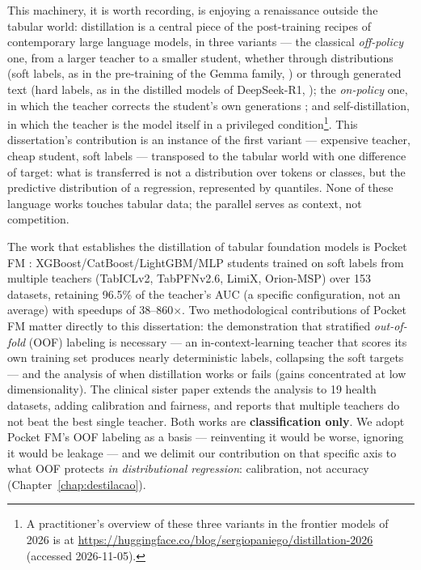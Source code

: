 This machinery, it is worth recording, is enjoying a renaissance
outside the tabular world: distillation is a central piece of the
post-training recipes of contemporary large language models, in
three variants --- the classical \emph{off-policy} one, from a
larger teacher to a smaller student, whether through distributions
(soft labels, as in the pre-training of the Gemma family,
\citealp{gemma2025}) or through generated text (hard labels, as in
the distilled models of DeepSeek-R1, \citealp{deepseek2025}); the
\emph{on-policy} one, in which the teacher corrects the student's
own generations \citep{agarwal2024}; and self-distillation, in
which the teacher is the model itself in a privileged
condition\footnote{A practitioner's overview of these three
variants in the frontier models of 2026 is at
\url{https://huggingface.co/blog/sergiopaniego/distillation-2026}
(accessed 2026-11-05).}. This dissertation's contribution is an
instance of the first variant --- expensive teacher, cheap student,
soft labels --- transposed to the tabular world with one difference
of target: what is transferred is not a distribution over tokens or
classes, but the predictive distribution of a regression,
represented by quantiles. None of these language works touches
tabular data; the parallel serves as context, not competition.

The work that establishes the distillation of tabular foundation
models is Pocket FM \citep{pocketfm2026}:
XGBoost/CatBoost/LightGBM/MLP students trained on soft labels from
multiple teachers (TabICLv2, TabPFNv2.6, LimiX, Orion-MSP) over 153
datasets, retaining 96.5\% of the teacher's AUC (a specific
configuration, not an average) with speedups of
38--860$\times$. Two methodological contributions of Pocket FM
matter directly to this dissertation: the demonstration that
stratified \emph{out-of-fold} (OOF) labeling is necessary --- an
in-context-learning teacher that scores its own training set
produces nearly deterministic labels, collapsing the soft targets
--- and the analysis of when distillation works or fails (gains
concentrated at low dimensionality). The clinical sister paper
\citep{pocketfmhealth2026} extends the analysis to 19 health
datasets, adding calibration and fairness, and reports that
multiple teachers do not beat the best single teacher. Both works
are \textbf{classification only}. We adopt Pocket FM's OOF labeling
as a basis --- reinventing it would be worse, ignoring it would be
leakage --- and we delimit our contribution on that specific axis
to what OOF protects \emph{in distributional regression}:
calibration, not accuracy (Chapter~\ref{chap:destilacao}).

